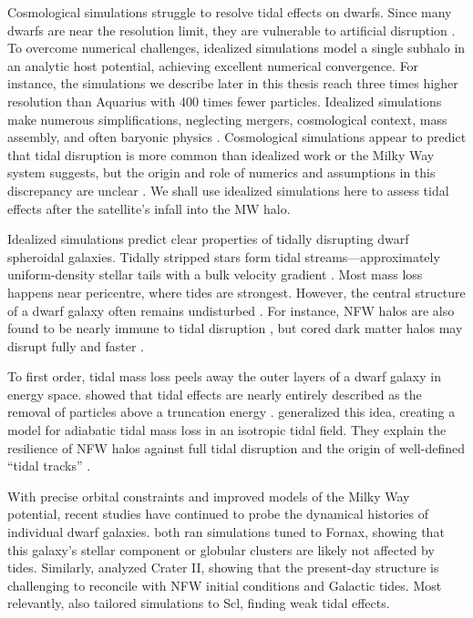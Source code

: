 Cosmological simulations struggle to resolve tidal effects on dwarfs.
Since many dwarfs are near the resolution limit, they are vulnerable to
artificial disruption
\citep[e.g.,][]{vandenbosch+2018, santos-santos+2025}. To overcome
numerical challenges, idealized simulations model a single subhalo in an
analytic host potential, achieving excellent numerical convergence. For
instance, the simulations we describe later in this thesis reach three
times higher resolution than Aquarius \citep{springel+2008} with 400
times fewer particles. Idealized simulations make numerous
simplifications, neglecting mergers, cosmological context, mass
assembly, and often baryonic physics
\citep[e.g.,][]{hayashi+2003, bullock+johnston2005, klimentowski+2009, ogiya+2019}.
Cosmological simulations appear to predict that tidal disruption is more
common than idealized work or the Milky Way system suggests, but the
origin and role of numerics and assumptions in this discrepancy are
unclear \citep{panithanpaisal+2021, shipp+2023, riley+2024}. We shall
use idealized simulations here to assess tidal effects after the
satellite's infall into the MW halo.

Idealized simulations predict clear properties of tidally disrupting
dwarf spheroidal galaxies. Tidally stripped stars form tidal
streams---approximately uniform-density stellar tails with a bulk
velocity gradient
\citep[e.g.,][]{moore+davis1994, johnston+spergel+hernquist1995, read+2006}.
Most mass loss happens near pericentre, where tides are strongest.
However, the central structure of a dwarf galaxy often remains
undisturbed \citep{oh+lin+aarseth1995, piatek+pryor1995}. For instance,
NFW halos are also found to be nearly immune to tidal disruption
\citep{EP2020}, but cored dark matter halos may disrupt fully and faster
\citep[e.g.,][]{penarrubia+2010, errani+2023a}.

To first order, tidal mass loss peels away the outer layers of a dwarf
galaxy in energy space.
\citet{drakos+taylor+benson2020, drakos+taylor+benson2022, amorisco2021}
showed that tidal effects are nearly entirely described as the removal
of particles above a truncation energy \citep[see
also][]{choi+weinberg+katz2009}. \citet{stucker+2023} generalized this
idea, creating a model for adiabatic tidal mass loss in an isotropic
tidal field. They explain the resilience of NFW halos against full tidal
disruption and the origin of well-defined ``tidal tracks'' \citep[as
observed in][]{PNM2008, green+vandenbosch2019, EN2021}.

With precise orbital constraints and improved models of the Milky Way
potential, recent studies have continued to probe the dynamical
histories of individual dwarf galaxies.
\citet{battaglia+sollima+nipoti2015, borukhovetskaya+2022, dicintio+2024}
both ran simulations tuned to Fornax, showing that this galaxy's stellar
component or globular clusters are likely not affected by tides.
Similarly, \citet{borukhovetskaya+2022a} analyzed Crater II, showing
that the present-day structure is challenging to reconcile with NFW
initial conditions and Galactic tides. Most relevantly,
\citet{iorio+2019} also tailored simulations to Scl, finding weak tidal
effects.

